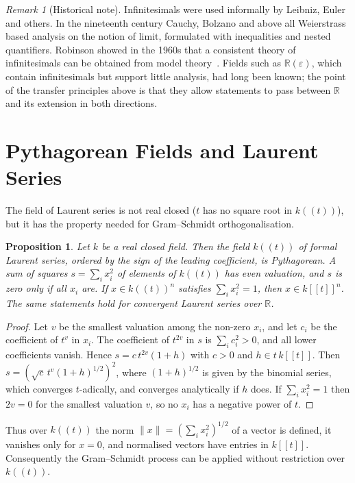\documentclass[12pt, a4paper]{report}
\theoremstyle{plain}
\newtheorem{proposition}[theorem]{Proposition}
\theoremstyle{definition}
\theoremstyle{remark}
\newtheorem{remark}[theorem]{Remark}
\theoremstyle{plain}
\newcommand{\RR}{\mathbb{R}}
\begin{document}
\begin{remark}[Historical note]
Infinitesimals were used informally by Leibniz, Euler and others. In the nineteenth century Cauchy, Bolzano and above all Weierstrass based analysis on the notion of limit, formulated with inequalities and nested quantifiers. Robinson showed in the 1960s that a consistent theory of infinitesimals can be obtained from model theory~\cite{Robinson1966}. Fields such as $\RR(\varepsilon)$, which contain infinitesimals but support little analysis, had long been known; the point of the transfer principles above is that they allow statements to pass between $\RR$ and its extension in both directions.
\end{remark}
\section{Pythagorean Fields and Laurent Series}
\label{sec:pythagorean}
The field of Laurent series is not real closed ($t$ has no square root in $k((t))$), but it has the property needed for Gram--Schmidt orthogonalisation.

\begin{proposition}\label{prop:laurent-pythagorean}
Let $k$ be a real closed field. Then the field $k((t))$ of formal Laurent series, ordered by the sign of the leading coefficient, is Pythagorean. A sum of squares $s=\sum_i x_i^2$ of elements of $k((t))$ has even valuation, and $s$ is zero only if all $x_i$ are. If $x\in k((t))^n$ satisfies $\sum_ix_i^2=1$, then $x\in k[[t]]^n$. The same statements hold for convergent Laurent series over $\RR$.
\end{proposition}
\begin{proof}
Let $v$ be the smallest valuation among the non-zero $x_i$, and let $c_i$ be the coefficient of $t^v$ in $x_i$. The coefficient of $t^{2v}$ in $s$ is $\sum_ic_i^2>0$, and all lower coefficients vanish. Hence $s=c\,t^{2v}(1+h)$ with $c>0$ and $h\in t\,k[[t]]$. Then $s=(\sqrt c\,t^v(1+h)^{1/2})^2$, where $(1+h)^{1/2}$ is given by the binomial series, which converges $t$-adically, and converges analytically if $h$ does. If $\sum_ix_i^2=1$ then $2v=0$ for the smallest valuation $v$, so no $x_i$ has a negative power of $t$.
\end{proof}

Thus over $k((t))$ the norm $\|x\|=(\sum_ix_i^2)^{1/2}$ of a vector is defined, it vanishes only for $x=0$, and normalised vectors have entries in $k[[t]]$. Consequently the Gram--Schmidt process can be applied without restriction over $k((t))$.
\end{document}
